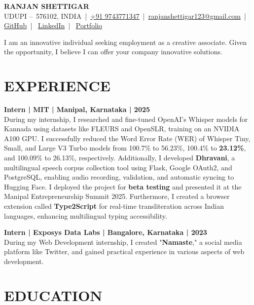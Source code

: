 \documentclass[10pt, letterpaper]{article}
\newcommand{\entrytitle}[4]{%
    {\fontsize{12pt}{14pt}\selectfont\textbf{#1 | #2 | #3 | #4}}\\[\parskip] %
}
\newcommand{\bodyfont}{\fontsize{10pt}{12pt}\selectfont}
\newcommand{\phone}[1]{\href{tel:#1}{#1}}
\newcommand{\email}[1]{\href{mailto:#1}{#1}}
\begin{document}
\begin{center}
    {\fontsize{18pt}{22pt}\selectfont\bfseries RANJAN SHETTIGAR} \\[1.2ex]
    {\fontsize{10pt}{12pt}\selectfont
     UDUPI – 576102, INDIA | \phone{+91 9743771347} | \email{ranjanshettigar123@gmail.com} | 
     \href{https://github.com/Ranjan-Shettigar}{GitHub} | 
     \href{https://www.linkedin.com/in/ranjanshettigar}{LinkedIn} | 
     \href{https://ranjan.pages.dev}{Portfolio}}
\end{center}

{\bodyfont
\justifying
I am an innovative individual seeking employment as a creative associate. Given the opportunity, I believe I can offer your company innovative solutions.
}

\section*{EXPERIENCE}

\entrytitle{Intern}{MIT}{Manipal, Karnataka}{2025}
{\bodyfont
\justifying
During my internship, I researched and fine-tuned OpenAI's Whisper models for Kannada using datasets like FLEURS and OpenSLR, training on an NVIDIA A100 GPU. I successfully reduced the Word Error Rate (WER) of Whisper Tiny, Small, and Large V3 Turbo models from 100.7\% to 56.23\%, 100.4\% to \textbf{23.12\%}, and 100.09\% to 26.13\%, respectively. Additionally, I developed \textbf{Dhravani}, a multilingual speech corpus collection tool using Flask, Google OAuth2, and PostgreSQL, enabling audio recording, validation, and automatic syncing to Hugging Face. I deployed the project for \textbf{beta testing} and presented it at the Manipal Entrepreneurship Summit 2025. Furthermore, I created a browser extension called \textbf{Type2Script} for real-time transliteration across Indian languages, enhancing multilingual typing accessibility.
}

\entrytitle{Intern}{Exposys Data Labs}{Bangalore, Karnataka}{2023}
{\bodyfont
\justifying
During my Web Development internship, I created "\textbf{Namaste}," a social media platform like Twitter, and gained practical experience in various aspects of web development.
}

\section*{EDUCATION}
\end{document}
